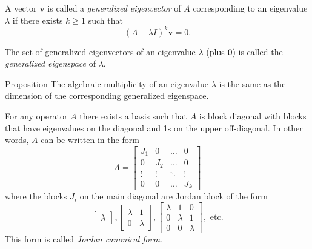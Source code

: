 \documentclass [aspectratio=169]{beamer}
\newcommand{\bv}{{\mathbf{v}}}
\newcommand{\zerovec}{{\mathbf{0}}}
\begin{document}
\begin{frame}
\begin{definition}
A vector $\bv$ is called a \emph{generalized eigenvector} of $A$ corresponding to an eigenvalue $\lambda$ if there exists $k \geq 1$ such that 
$$ (A - \lambda I)^k \bv = 0.$$
\end{definition}
The set of generalized eigenvectors of an eigenvalue $\lambda$ (plus $\zerovec$) is called the \emph{generalized eigenspace} of $\lambda$.

\vspace{1em}

\begin{exampleblock}{Proposition}
The algebraic multiplicity of an eigenvalue $\lambda$ is the same as the dimension of the corresponding generalized eigenspace.
\end{exampleblock}

\end{frame}


\begin{frame}
\begin{theorem}
For any operator $A$ there exists a basis such that $A$ is block diagonal with blocks that have eigenvalues on the diagonal and 1s on the upper off-diagonal. In other words, $A$ can be written in the form
$$ A = \begin{bmatrix} J_1 & 0 & \ldots & 0\\ 0 & J_2 & \ldots & 0 \\ \vdots & \vdots & \ddots & \vdots \\ 0 & 0 & \ldots & J_k \end{bmatrix} $$
where the blocks $J_i$ on the main diagonal are Jordan block of the form 
$$\begin{bmatrix} \lambda  \end{bmatrix}, \begin{bmatrix} \lambda & 1  \\ 0 &\lambda \end{bmatrix}, \begin{bmatrix} \lambda & 1 & 0 \\ 0 &\lambda & 1 \\ 0 & 0 & \lambda \end{bmatrix}, \text{ etc.}$$
This form is called \emph{Jordan canonical form}.
\end{theorem}
\end{frame}
\end{document}
